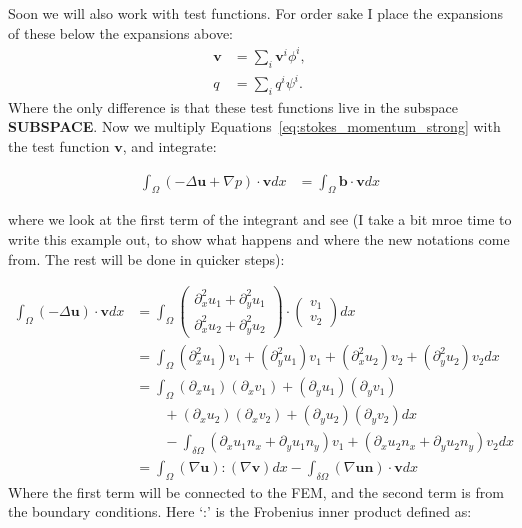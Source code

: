 \documentclass{article}
\begin{document}
Soon we will also work with test functions. For order sake I place the expansions of these below the expansions above:
\begin{eqnarray}
    \mathbf{v} &= \sum_i \mathbf{v}^i \phi^i, \label{eq:stokes_expansion_test_momentum_v}\\
            q  &= \sum_i         q ^i \psi^i. \label{eq:stokes_expansion_test_pressure_q}
\end{eqnarray}
Where the only difference is that these test functions live in the subspace \textbf{SUBSPACE}. Now we multiply Equations~\ref{eq:stokes_momentum_strong} with the test function $\mathbf{v}$, and integrate:

\begin{eqnarray*}
    \int_\Omega (-\Delta \mathbf{u}+\nabla p)\cdot\mathbf{v}dx &= \int_\Omega \mathbf{b}\cdot \mathbf{v}dx
\end{eqnarray*}

where we look at the first term of the integrant and see (I take a bit mroe time to write this example out, to show what happens and where the new notations come from. The rest will be done in quicker steps):

\begin{align*}
    \int_\Omega(-\Delta \mathbf{u})\cdot\mathbf{v} dx
    &=  \int_\Omega{ \begin{pmatrix}    
        \partial_x^2 u_1 + \partial_y^2 u_1\\
        \partial_x^2 u_2 + \partial_y^2 u_2
    \end{pmatrix}
        \cdot \begin{pmatrix}
            v_1 \\ v_2
        \end{pmatrix}dx} \\
    &= \int_\Omega (\partial_x^2 u_1)v_1+(\partial_y^2 u_1)v_1+(\partial_x^2 u_2)v_2+(\partial_y^2 u_2)v_2 dx \\
    &= \int_\Omega (\partial_x u_1)(\partial_x v_1) + (\partial_y u_1)(\partial_y v_1) \\ 
    &  \qquad +(\partial_x u_2)(\partial_x v_2) + (\partial_y u_2)(\partial_y v_2)dx\\
    &  \qquad - \int_{\delta \Omega} (\partial_x u_1 n_x+\partial_y u_1 n_y)v_1 + (\partial_x u_2 n_x+\partial_y u_2 n_y)v_2  dx \\
    &= \int_\Omega (\nabla \mathbf{u}):(\nabla \mathbf{v})dx - \int_{\delta\Omega}(\nabla \mathbf{un})\cdot \mathbf{v} dx
\end{align*}
Where the first term will be connected to the FEM, and the second term is from the boundary conditions. Here `:' is the Frobenius inner product defined as:
\end{document}
